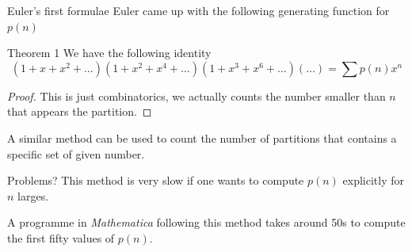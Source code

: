 \documentclass[pdf]{beamer}
\begin{document}
\begin{frame}{Euler's first formulae}
    Euler came up with the following generating function for $p(n)$
    \begin{block}{Theorem 1}
        We have the following identity
        \[(1+x+x^2+\ldots)(1+x^2+x^4+\ldots)(1+x^3+x^6+\ldots)(\ldots) = \sum p(n)x^n\]
    \end{block}
    \begin{proof}
        This is just combinatorics, we actually counts the number smaller than $n$ that appears the partition.
    \end{proof}
    A similar method can be used to count the number of partitions that contains a specific set of given number.
\end{frame}
\begin{frame}{Problems?}
    This method is very slow if one wants to compute $p(n)$ explicitly for $n$ larges.

    A programme in \textit{Mathematica} following this method takes around 50s to compute the first fifty values of $p(n)$.
\end{frame}
\end{document}
